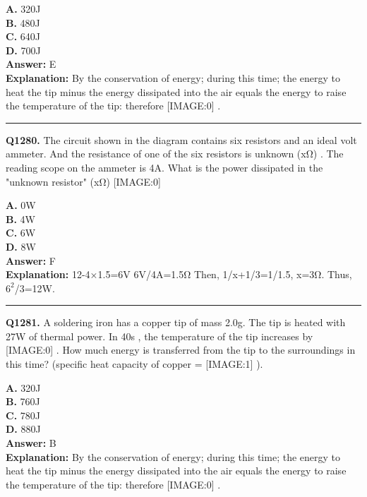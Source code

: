 \documentclass[12pt]{article}
\begin{document}
\textbf{A.} 320J \\
\textbf{B.} 480J \\
\textbf{C.} 640J \\
\textbf{D.} 700J \\

\textbf{Answer:} E \\
\textbf{Explanation:} By the conservation of energy; during this time; the energy to heat the tip minus the energy dissipated into the air equals the energy to raise the temperature of the tip: therefore
[IMAGE:0]
.

\hrule
\vspace{1em}


\noindent
\textbf{Q1280.} The circuit shown in the diagram contains six resistors and an ideal volt ammeter. And the resistance of one of the six resistors is unknown (xΩ) . The reading scope on the ammeter is 4A. What is the power dissipated in the "unknown resistor" (xΩ)
[IMAGE:0]



\textbf{A.} 0W \\
\textbf{B.} 4W \\
\textbf{C.} 6W \\
\textbf{D.} 8W \\

\textbf{Answer:} F \\
\textbf{Explanation:} 12-4×1.5=6V
6V/4A=1.5Ω
Then, 1/x+1/3=1/1.5, x=3Ω.
Thus, $6^2$/3=12W.

\hrule
\vspace{1em}


\noindent
\textbf{Q1281.} A soldering iron has a copper tip of mass
2.0g.
The tip is heated with 27W
of thermal power. In 40s
, the temperature of the tip increases by
[IMAGE:0]
.
How much energy is transferred from the tip to the surroundings in this time? (specific heat capacity of copper =
[IMAGE:1]
).



\textbf{A.} 320J \\
\textbf{B.} 760J \\
\textbf{C.} 780J \\
\textbf{D.} 880J \\

\textbf{Answer:} B \\
\textbf{Explanation:} By the conservation of energy; during this time; the energy to heat the tip minus the energy dissipated into the air equals the energy to raise the temperature of the tip: therefore
[IMAGE:0]
.
\end{document}
